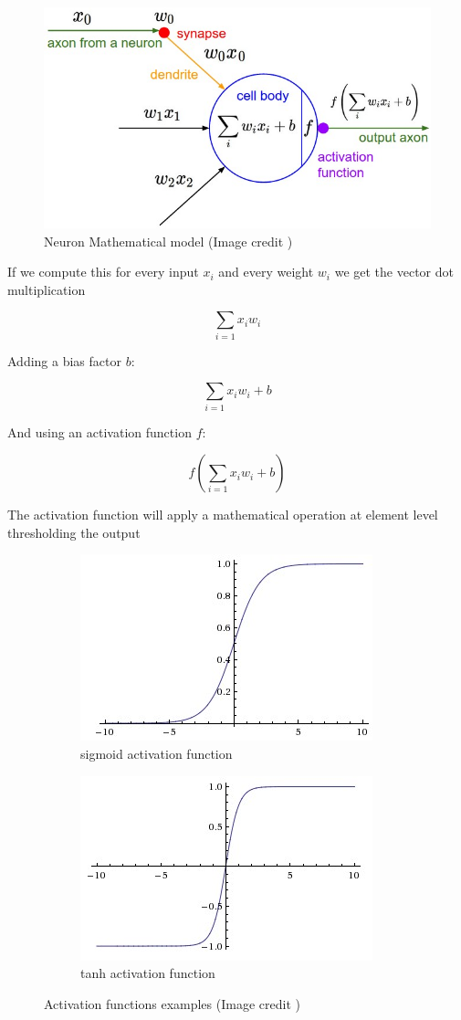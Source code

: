 \begin{figure}[th]
    \centering
    \includegraphics[width=1.0\textwidth]{Figures/Neuron}
    \decoRule
    \caption[Neuron Mathematical model]{Neuron Mathematical model (Image credit \cite{cs231n})}
    \label{fig:neuron}
\end{figure}

If we compute this for every input $x_i$ and every weight $w_i$ we get the vector dot multiplication

$$ \sum_{i=1} x_i w_i  $$ 

Adding a bias factor $b$:

$$ \sum_{i=1} x_i w_i  + b$$ 

And using an activation function $f$:

$$ f(\sum_{i=1} x_i w_i + b)  $$ 

The activation function will apply a mathematical operation at element level thresholding the output

\begin{figure}
    \centering
    \begin{subfigure}{.5\textwidth}
        \centering
        \includegraphics[width=.4\linewidth]{Figures/sigmoid}
        \caption{sigmoid activation function}
        \label{fig:sub1}
    \end{subfigure}%
    \begin{subfigure}{.5\textwidth}
        \centering
        \includegraphics[width=.4\linewidth]{Figures/tanh}
        \caption{tanh activation function}
        \label{fig:sub2}
    \end{subfigure}
    \caption{Activation functions examples (Image credit \cite{cs231n})}
    \label{fig:activations}
\end{figure}



